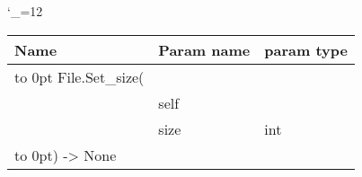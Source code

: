 \begingroup \catcode`\_=12 \tt
\begin{tabular}{lll}
\toprule
\textrm{Name}&\textrm{Param name}&\textrm{param type}\\
\midrule
\hbox to 0pt {File.Set_size(\hss}\\
& self\\
& size & int\\
\hbox to 0pt{) -> None\hss}\\
\bottomrule
\end{tabular}
\endgroup
